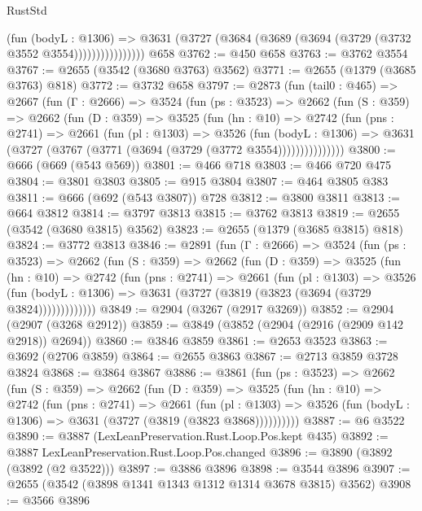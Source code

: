 \begin{lexlean}{RustStd}
\begin{coremodule}
                      (fun (bodyL : @1306) =>
                      @3631 (@3727 (@3684 (@3689 (@3694 (@3729 (@3732 @3552 @3554))))))))))))))))
    @658
@3762 := @450 @658
@3763 := @3762 @3554
@3767 := @2655 (@3542 (@3680 @3763) @3562)
@3771 := @2655 (@1379 (@3685 @3763) @818)
@3772 := @3732 @658
@3797 := @2873
    (fun (tail0 : @465) =>
    @2667
      (fun (Γ : @2666) =>
      @3524
        (fun (ps : @3523) =>
        @2662
          (fun (S : @359) =>
          @2662
            (fun (D : @359) =>
            @3525
              (fun (hn : @10) =>
              @2742
                (fun (pns : @2741) =>
                @2661
                  (fun (pl : @1303) =>
                  @3526
                    (fun (bodyL : @1306) =>
                    @3631 (@3727 (@3767 (@3771 (@3694 (@3729 (@3772 @3554)))))))))))))))
@3800 := @666 (@669 (@543 @569))
@3801 := @466 @718
@3803 := @466 @720 @475
@3804 := @3801 @3803
@3805 := @915 @3804
@3807 := @464 @3805 @383
@3811 := @666 (@692 (@543 @3807)) @728
@3812 := @3800 @3811
@3813 := @664 @3812
@3814 := @3797 @3813
@3815 := @3762 @3813
@3819 := @2655 (@3542 (@3680 @3815) @3562)
@3823 := @2655 (@1379 (@3685 @3815) @818)
@3824 := @3772 @3813
@3846 := @2891
    (fun (Γ : @2666) =>
    @3524
      (fun (ps : @3523) =>
      @2662
        (fun (S : @359) =>
        @2662
          (fun (D : @359) =>
          @3525
            (fun (hn : @10) =>
            @2742
              (fun (pns : @2741) =>
              @2661
                (fun (pl : @1303) =>
                @3526
                  (fun (bodyL : @1306) =>
                  @3631 (@3727 (@3819 (@3823 (@3694 (@3729 @3824)))))))))))))
@3849 := @2904 (@3267 (@2917 @3269))
@3852 := @2904 (@2907 (@3268 @2912))
@3859 := @3849 (@3852 (@2904 (@2916 (@2909 @142 @2918)) @2694))
@3860 := @3846 @3859
@3861 := @2653 @3523
@3863 := @3692 (@2706 @3859)
@3864 := @2655 @3863
@3867 := @2713 @3859 @3728 @3824
@3868 := @3864 @3867
@3886 := @3861
    (fun (ps : @3523) =>
    @2662
      (fun (S : @359) =>
      @2662
        (fun (D : @359) =>
        @3525
          (fun (hn : @10) =>
          @2742
            (fun (pns : @2741) =>
            @2661
              (fun (pl : @1303) =>
              @3526 (fun (bodyL : @1306) => @3631 (@3727 (@3819 (@3823 @3868))))))))))
@3887 := @6 @3522
@3890 := @3887 (LexLeanPreservation.Rust.Loop.Pos.kept @435)
@3892 := @3887 LexLeanPreservation.Rust.Loop.Pos.changed
@3896 := @3890 (@3892 (@3892 (@2 @3522)))
@3897 := @3886 @3896
@3898 := @3544 @3896
@3907 := @2655 (@3542 (@3898 @1341 @1343 @1312 @1314 @3678 @3815) @3562)
@3908 := @3566 @3896

\end{coremodule}
\end{lexlean}

